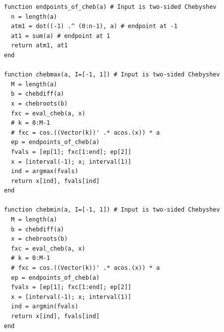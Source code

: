 \documentclass[11pt,a4paper,titlepage]{jsreport}
\theoremstyle{definition}
\begin{document}
\begin{lstlisting}[caption=FourierChebyshev.jl]
function endpoints_of_cheb(a) # Input is two-sided Chebyshev
  n = length(a)
  atm1 = dot((-1) .^ (0:n-1), a) # endpoint at -1
  at1 = sum(a) # endpoint at 1
  return atm1, at1
end

function chebmax(a, I=[-1, 1]) # Input is two-sided Chebyshev
  M = length(a)
  b = chebdiff(a)
  x = chebroots(b)
  fxc = eval_cheb(a, x)
  # k = 0:M-1
  # fxc = cos.((Vector(k))' .* acos.(x)) * a
  ep = endpoints_of_cheb(a)
  fvals = [ep[1]; fxc[1:end]; ep[2]]
  x = [interval(-1); x; interval(1)]
  ind = argmax(fvals)
  return x[ind], fvals[ind]
end

function chebmin(a, I=[-1, 1]) # Input is two-sided Chebyshev
  M = length(a)
  b = chebdiff(a)
  x = chebroots(b)
  fxc = eval_cheb(a, x)
  # k = 0:M-1
  # fxc = cos.((Vector(k))' .* acos.(x)) * a
  ep = endpoints_of_cheb(a)
  fvals = [ep[1]; fxc[1:end]; ep[2]]
  x = [interval(-1); x; interval(1)]
  ind = argmin(fvals)
  return x[ind], fvals[ind]
end
\end{lstlisting}
\end{document}
